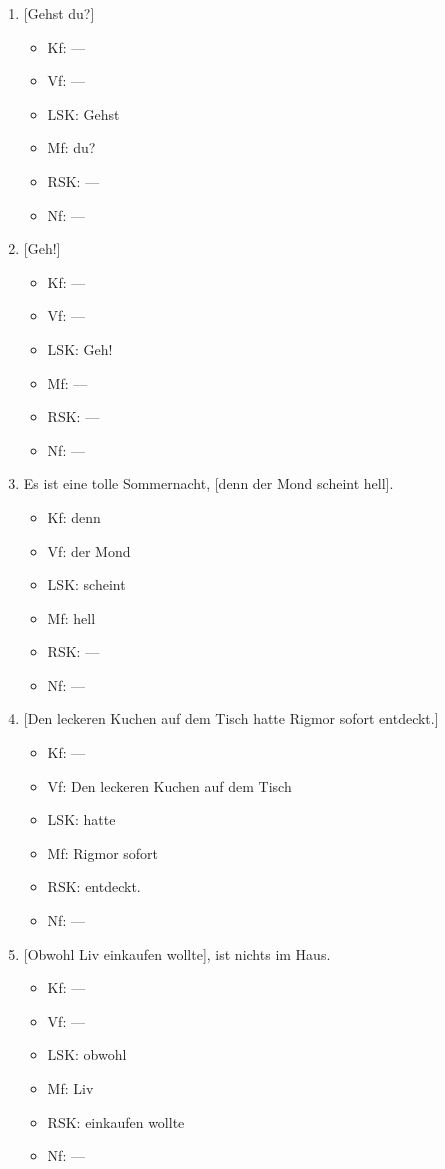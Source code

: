 \begin{enumerate}
  \item{} [Gehst du?]
    \begin{itemize}
      \item Kf: ---
      \item Vf: ---
      \item LSK: Gehst
      \item Mf: du?
      \item RSK: ---
      \item Nf: ---
    \end{itemize}
  \item{} [Geh!]
    \begin{itemize}
      \item Kf: ---
      \item Vf: ---
      \item LSK: Geh!
      \item Mf: ---
      \item RSK: ---
      \item Nf: ---
    \end{itemize}
  \item Es ist eine tolle Sommernacht, [denn der Mond scheint hell].
    \begin{itemize}
      \item Kf: denn
      \item Vf: der Mond
      \item LSK: scheint
      \item Mf: hell
      \item RSK: ---
      \item Nf: ---
    \end{itemize}
  \item{} [Den leckeren Kuchen auf dem Tisch hatte Rigmor sofort entdeckt.]
    \begin{itemize}
      \item Kf: ---
      \item Vf: Den leckeren Kuchen auf dem Tisch
      \item LSK: hatte
      \item Mf: Rigmor sofort
      \item RSK: entdeckt.
      \item Nf: ---
    \end{itemize}
  \item{} [Obwohl Liv einkaufen wollte], ist nichts im Haus.
    \begin{itemize}
      \item Kf: ---
      \item Vf: ---
      \item LSK: obwohl
      \item Mf: Liv
      \item RSK: einkaufen wollte
      \item Nf: ---
    \end{itemize}



\end{enumerate}
